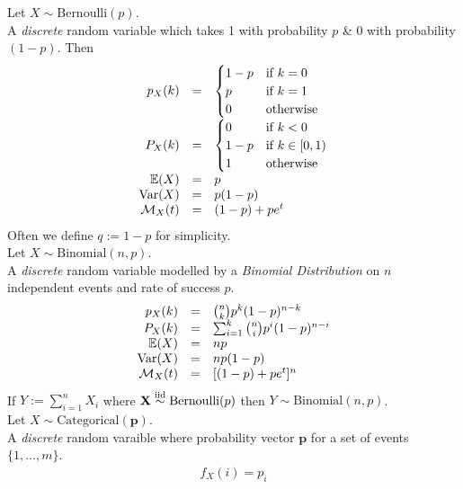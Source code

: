 \documentclass[11pt,a4paper]{article}
\begin{document}
Let $X\sim\text{Bernoulli}(p)$.\\
A \textit{discrete} random variable which takes 1 with probability $p$ \& 0 with probability $(1-p)$. Then
\[\begin{array}{rcl}
p_X(k)&=&\begin{cases}1-p&\text{if }k=0\\p&\text{if }k=1\\0&\text{otherwise}\end{cases}\\
P_X(k)&=&\begin{cases}0&\text{if }k<0\\1-p&\text{if }k\in[0,1)\\1&\text{otherwise}\end{cases}\\
\mathbb{E}(X)&=&p\\
\mathrm{Var}(X)&=&p(1-p)\\
\mathcal{M}_X(t)&=&(1-p)+pe^t
\end{array}\]
\nb Often we define $q:=1-p$ for simplicity.\\

Let $X\sim\text{Binomial}(n,p)$.\\
A \textit{discrete} random variable modelled by a \textit{Binomial Distribution} on $n$ independent events and rate of success $p$.\\
\[\begin{array}{rcl}
p_X(k)&=&{n\choose k}p^k(1-p)^{n-k}\\
P_X(k)&=&\sum_{i=1}^k{n\choose i}p^i(1-p)^{n-i}\\
\mathbb{E}(X)&=&np\\
\mathrm{Var}(X)&=&np(1-p)\\
\mathcal{M}_X(t)&=&[(1-p)+pe^t]^n
\end{array}\]
\nb If $Y:=\sum_{i=1}^nX_i$ where $\textbf{X}\overset{\text{iid}}{\sim}\text{Bernoulli}(p)$ then $Y\sim\text{Binomial}(n,p)$.\\

Let $X\sim\text{Categorical}(\textbf{p})$.\\
A \textit{discrete} random varaible where probability vector $\textbf{p}$ for a set of events $\{1,\dots,m\}$.\\
\[\begin{array}{rcl}
f_X(i)=p_i
\end{array}\]
\end{document}
